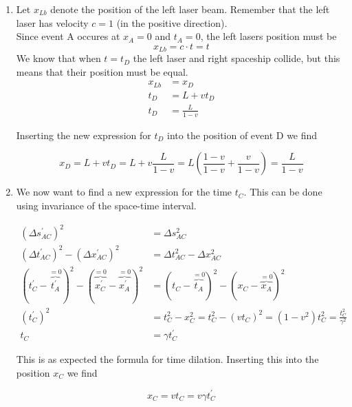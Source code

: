 \documentclass[a4paper,10pt,english]{article}
\begin{document}
\begin{enumerate}
\item Let $x_{Lb}$ denote the position of the left laser beam. Remember that the left laser has velocity $c=1$ (in the positive direction).
\\
Since event A occures at $x_{A}=0$ and $t_{A}=0$, the left lasers position must be 
\begin{equation}\label{eq:left_laser}x_{Lb}=c\cdot t=t\end{equation}
We know that when $t=t_{D}$ the left laser and right spaceship collide, but this means that their position must be equal.
\begin{align*}
x_{Lb}&=x_{D}\\
t_{D}&=L+vt_{D}\\
t_{D}&=\frac{L}{1-v}
\end{align*}

Inserting the new expression for $t_{D}$ into the position of event D we find

\begin{equation*}
x_{D}=L+vt_{D}=L+v\frac{L}{1-v}=L\left(\frac{1-v}{1-v}+\frac{v}{1-v}\right)=\frac{L}{1-v}
\end{equation*}

\item We now want to find a new expression for the time $t_{C}$. This can be done using invariance of the space-time interval.

\begin{align*}
\left(\Delta s_{AC}^{\prime}\right)^{2}&=\Delta s_{AC}^{2}\\
\left(\Delta t_{AC}^{\prime}\right)^{2}-\left(\Delta x_{AC}^{\prime}\right)^{2}&=\Delta t_{AC}^{2}-\Delta x_{AC}^{2}\\
\left(t_{C}^{\prime}-\overbrace{t_{A}^{\prime}}^{=0}\right)^{2}-\left(\overbrace{x_{C}^{\prime}}^{=0}-\overbrace{x_{A}^{\prime}}^{=0}\right)^{2}&=\left(t_{C}-\overbrace{t_{A}}^{=0}\right)^{2}-\left(x_{C}-\overbrace{x_{A}}^{=0}\right)^{2}\\
\left(t_{C}^{\prime}\right)^{2}&=t_{C}^{2}-x_{C}^{2}=t_{C}^{2}-(vt_{C})^{2}=(1-v^{2})t_{C}^{2}=\frac{t_{C}^{2}}{\gamma^{2}}\\
t_{C}&=\gamma t_{C}^{\prime}
\end{align*}

This is as expected the formula for time dilation. Inserting this into the position $x_{C}$ we find

\begin{equation*}
x_{C}=vt_{C}=v\gamma t_{C}^{\prime}
\end{equation*}


\end{enumerate}
\end{document}
